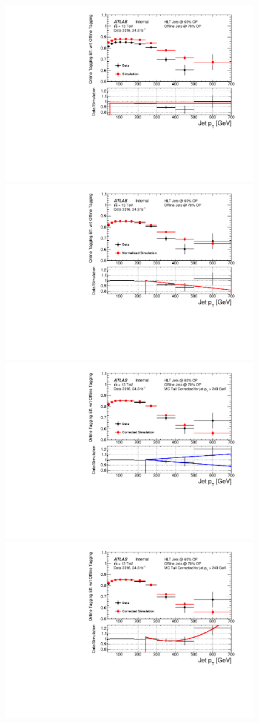 \begin{figure}[!ht]
\begin{center}
\captionsetup[subfigure]{aboveskip=0pt,justification=centering}
   {\includegraphics[width=0.47\linewidth, angle=0]{figs/Trigger/Full_GRL_bslt2mm_effFit_jetPt.pdf} }
   {\includegraphics[width=0.47\linewidth, angle=0]{figs/Trigger/Full_GRL_bslt2mm_effNormFit_jetPt.pdf}} \\
   {\includegraphics[width=0.47\linewidth, angle=0]{figs/Trigger/Full_GRL_bslt2mm_effCorrShapeErr_jetPt.pdf}}
   {\includegraphics[width=0.47\linewidth, angle=0]{figs/Trigger/Full_GRL_bslt2mm_effCorrFitQuad_jetPt.pdf}}

\end{center}
\end{figure}
